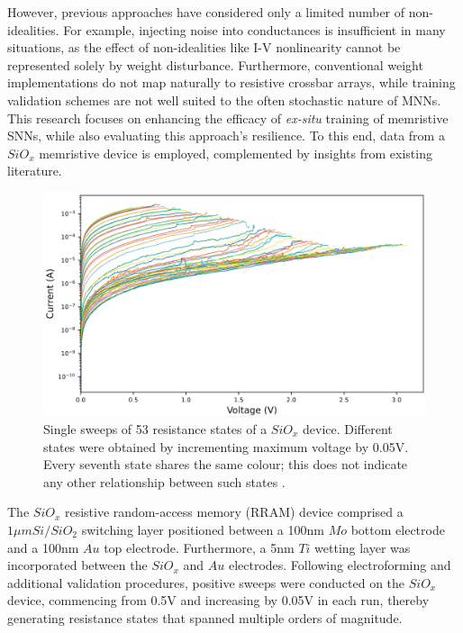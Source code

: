 \noindent However, previous approaches have considered only a limited number of non-idealities. For example, injecting noise into conductances is insufficient in many situations, as the effect of non-idealities like I-V nonlinearity cannot be represented solely by weight disturbance. Furthermore, conventional weight implementations do not map naturally to resistive crossbar arrays, while training validation schemes are not well suited to the often stochastic nature of MNNs. This research focuses on enhancing the efficacy of \textit{ex-situ} training of memristive SNNs, while also evaluating this approach's resilience. To this end, data from a  $SiO_x$  memristive device is employed, complemented by insights from existing literature.\\

\begin{figure}[htbp!] 
\centering    
\includegraphics[width=1\textwidth]{Chapter6/Figs/g.png}
\caption[Single sweeps of 53 resistance states of a $SiO_x$ device.]{Single sweeps of 53 resistance states of a $SiO_x$ device. Different states were obtained by incrementing maximum voltage by 0.05V. Every seventh state shares the same colour; this does not indicate any other relationship between such states \cite{nikolaos_barmpatsalos_2021_5762184}.}
\label{fig:6g}
\end{figure}


\noindent The $SiO_x$ resistive random-access memory (RRAM) device comprised a $1 \mu m Si/SiO_2$  switching layer positioned between a 100nm $Mo$ bottom electrode and a 100nm $Au$ top electrode. Furthermore, a 5nm $Ti$ wetting layer was incorporated between the $SiO_x$ and $Au$ electrodes. Following electroforming and additional validation procedures, positive sweeps were conducted on the $SiO_x$ device, commencing from 0.5V and increasing by 0.05V in each run, thereby generating resistance states that spanned multiple orders of magnitude.\\

